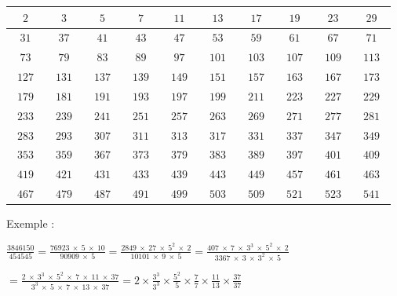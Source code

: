 \documentclass[a4paper]{article}
\begin{document}
\begin{center}
\begin{tabular}{|c|c|c|c|c|c|c|c|c|c|}

\hline
  ~$2$~ &   ~$3$~ &   ~$5$~ &   ~$7$~ &  ~$11$~ &  ~$13$~ &  ~$17$~ &  ~$19$~ &  ~$23$~ &  ~$29$~ \\
\hline
 ~$31$~ &  ~$37$~ &  ~$41$~ &  ~$43$~ &  ~$47$~ &  ~$53$~ &  ~$59$~ &  ~$61$~ &  ~$67$~ &  ~$71$~ \\
\hline
 ~$73$~ &  ~$79$~ &  ~$83$~ &  ~$89$~ &  ~$97$~ & ~$101$~ & ~$103$~ & ~$107$~ & ~$109$~ & ~$113$~ \\
\hline
~$127$~ & ~$131$~ & ~$137$~ & ~$139$~ & ~$149$~ & ~$151$~ & ~$157$~ & ~$163$~ & ~$167$~ & ~$173$~ \\
\hline
~$179$~ & ~$181$~ & ~$191$~ & ~$193$~ & ~$197$~ & ~$199$~ & ~$211$~ & ~$223$~ & ~$227$~ & ~$229$~ \\
\hline
~$233$~ & ~$239$~ & ~$241$~ & ~$251$~ & ~$257$~ & ~$263$~ & ~$269$~ & ~$271$~ & ~$277$~ & ~$281$~ \\
\hline
~$283$~ & ~$293$~ & ~$307$~ & ~$311$~ & ~$313$~ & ~$317$~ & ~$331$~ & ~$337$~ & ~$347$~ & ~$349$~ \\
\hline
~$353$~ & ~$359$~ & ~$367$~ & ~$373$~ & ~$379$~ & ~$383$~ & ~$389$~ & ~$397$~ & ~$401$~ & ~$409$~ \\
\hline
~$419$~ & ~$421$~ & ~$431$~ & ~$433$~ & ~$439$~ & ~$443$~ & ~$449$~ & ~$457$~ & ~$461$~ & ~$463$~ \\
\hline
~$467$~ & ~$479$~ & ~$487$~ & ~$491$~ & ~$499$~ & ~$503$~ & ~$509$~ & ~$521$~ & ~$523$~ & ~$541$~ \\
\hline

\end{tabular}
\end{center}

\vspace{1.5 cm}

{\noindent Exemple :}

\vspace{2 mm}

{\Large $ \frac{3846150}{454545} = \frac{76923 ~ \times ~ 5 ~ \times ~ 10}{90909 ~ \times ~ 5} = \frac{2849 ~ \times ~ 27 ~ \times ~ 5^2 ~ \times ~ 2}{10101 ~ \times ~ 9 ~ \times ~ 5} = \frac{407 ~ \times ~ 7 ~ \times ~ 3^3 ~ \times ~ 5^2 ~ \times ~ 2}{3367 ~ \times ~ 3 ~ \times ~ 3^2 ~ \times ~ 5}$}

\vspace{4 mm}

{\Large {} $= \frac{2 ~ \times ~ 3^3 ~ \times ~ 5^2 ~ \times ~ 7 ~ \times ~ 11 ~ \times ~ 37}{3^3 ~ \times ~ 5 ~ \times ~ 7 ~ \times ~ 13 ~ \times ~ 37} = 2 \times \frac{3^3}{3^3} \times \frac{5^2}{5} \times \frac{7}{7} \times \frac{11}{13} \times \frac{37}{37}$}
\end{document}
